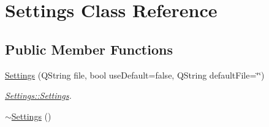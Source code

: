 \hypertarget{class_settings}{\section{Settings Class Reference}
\label{class_settings}
}
\subsection*{Public Member Functions}
\begin{DoxyCompactItemize}
\item 
\hyperlink{class_settings_ae2fdda176f95e68511a7fff150330e27}{Settings} (Q\+String file, bool use\+Default=false, Q\+String default\+File=\char`\"{}\char`\"{})
\begin{DoxyCompactList}\small\item\em \hyperlink{class_settings_ae2fdda176f95e68511a7fff150330e27}{Settings\+::\+Settings}. \end{DoxyCompactList}\item 
\hypertarget{class_settings_a4a65be5921dfc9fddc476e5320541d89}{\hyperlink{class_settings_a4a65be5921dfc9fddc476e5320541d89}{$\sim$\+Settings} ()}\label{class_settings_a4a65be5921dfc9fddc476e5320541d89}


\end{DoxyCompactItemize}

